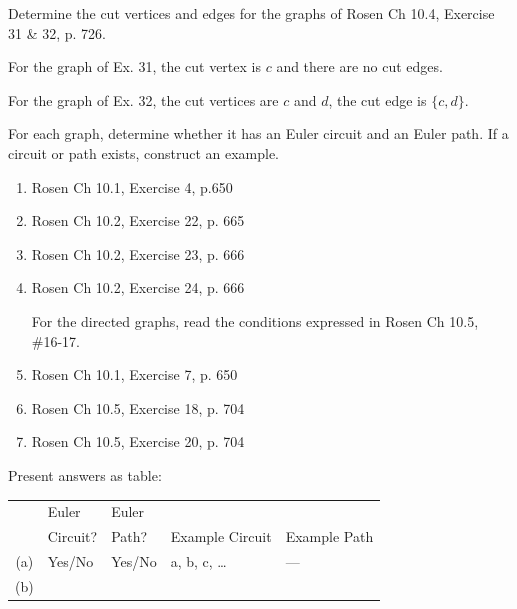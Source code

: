 \begin{questions}
 Determine the cut vertices and edges for the graphs of Rosen Ch 10.4, Exercise 31 \& 32, p. 726.
    \ifprintanswers
        \vspace{-10pt}
    \fi
    \begin{solution}
        For the graph of Ex. 31, the cut vertex is $c$ and there are no cut edges. 

        For the graph of Ex. 32, the cut vertices are $c$ and $d$, the cut edge is $\{c, d\}$.
    \end{solution} 
    




  For each graph, determine whether it has an Euler circuit and an Euler path.  If a circuit or path exists, construct an example.
\begin{enumerate}[label=(\alph*), topsep=0pt, itemsep=0pt, parsep=0pt]
    \item Rosen Ch 10.1, Exercise 4, p.650
    \item Rosen Ch 10.2, Exercise 22, p. 665
    \item Rosen Ch 10.2, Exercise 23, p. 666
    \item Rosen Ch 10.2, Exercise 24, p. 666

    For the directed graphs, read the conditions expressed in Rosen Ch 10.5, \#16-17.  
    \item Rosen Ch 10.1, Exercise 7, p. 650
    \item Rosen Ch 10.5, Exercise 18, p. 704
    \item Rosen Ch 10.5, Exercise 20, p. 704

\end{enumerate}

\ifprintanswers 
\else
Present answers as table: 

\begin{tabular}{|c||l|l||l|l|}
    \hline 
          & Euler & Euler &  & \\
          & Circuit? & Path? & Example Circuit & Example Path \\
    \hline 
        (a) & Yes/No & Yes/No & a, b, c, \ldots \hspace*{0.8in}  & --- \hspace*{1in} \\
    \hline 
        (b) & & & & \\
    \hline 
\end{tabular}
\fi


\end{questions}

